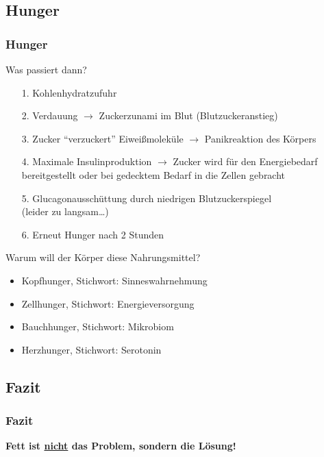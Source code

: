 \documentclass[xcolor=dvipsnames]{beamer}
\begin{document}
    \subsection{Hunger}
    \begin{frame}[allowframebreaks]
        \frametitle{Hunger}
        \begin{block}{Was passiert dann?}
            \begin{itemize}
                \setlength\itemsep{1em}
                \item[1.] Kohlenhydratzufuhr
                \item[2.] Verdauung $\rightarrow$ Zuckerzunami im Blut (Blutzuckeranstieg)
                \item[3.] Zucker "`verzuckert"' Eiweißmoleküle $\rightarrow$ Panikreaktion des Körpers
                \item[4.] Maximale Insulinproduktion $\rightarrow$ Zucker wird für den Energiebedarf bereitgestellt oder
                bei gedecktem Bedarf in die Zellen gebracht
                \item[5.] Glucagonausschüttung durch niedrigen Blutzuckerspiegel\\(leider zu langsam\ldots)
                \item[6.] Erneut Hunger nach 2 Stunden
            \end{itemize}
        \end{block}

        \framebreak

        \begin{block}{Warum will der Körper diese Nahrungsmittel?}
            \begin{itemize}
                \setlength\itemsep{1em}
                \item Kopfhunger,   Stichwort: Sinneswahrnehmung
                \item Zellhunger,   Stichwort: Energieversorgung
                \item Bauchhunger,  Stichwort: Mikrobiom
                \item Herzhunger,   Stichwort: Serotonin
            \end{itemize}
        \end{block}
    \end{frame}

    \subsection{Fazit}
    \begin{frame}
        \frametitle{Fazit}
        \begin{center}
            \textbf{Fett ist \underline{nicht} das Problem, sondern die Lösung!}
        \end{center}
    \end{frame}
\end{document}
